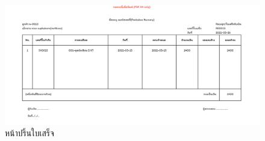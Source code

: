         \begin{figure}
          \begin{center}
          \includegraphics[width=\linewidth]{images/slipPage.png}
          \end{center}
          \caption[หน้าปริ้นใบเสร็จ]{หน้าปริ้นใบเสร็จ}
          \label{fig:slipPage}
          \end{figure}